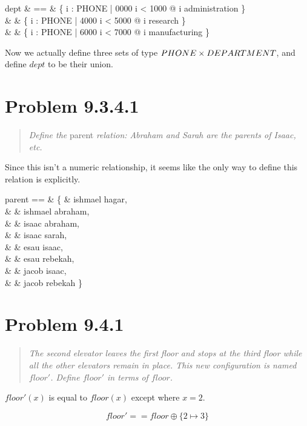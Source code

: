 \documentclass[10pt]{article}
\begin{document}
\begin{syntax}
  dept & == & \{ i : PHONE | 0000 \leq i < 1000 @ i \mapsto administration \} \union \\
       &    & \{ i : PHONE | 4000 \leq i < 5000 @ i \mapsto research \} \union       \\
       &    & \{ i : PHONE | 6000 \leq i < 7000 @ i \mapsto manufacturing \}
\end{syntax}

Now we actually define three sets of type $PHONE \times DEPARTMENT$, and define $dept$ to be their
union.



\section{Problem 9.3.4.1}
\begin{quote}
  {\it Define the} parent {\it relation: Abraham and Sarah are the parents of Isaac, etc.}
\end{quote}

Since this isn't a numeric relationship, it seems like the only way to define this relation is
explicitly.

\begin{syntax}
  parent == & \{ & ishmael \mapsto hagar,   \\
            &    & ishmael \mapsto abraham, \\
            &    & isaac \mapsto abraham,   \\
            &    & isaac \mapsto sarah,     \\
            &    & esau \mapsto isaac,      \\
            &    & esau \mapsto rebekah,    \\
            &    & jacob \mapsto isaac,     \\
            &    & jacob \mapsto rebekah \}
\end{syntax}



\section{Problem 9.4.1}
\begin{quote}
  {\it The second elevator leaves the first floor and stops at the third floor while all the other
    elevators remain in place.  This new configuration is named $floor'$.  Define $floor'$ in terms
    of $floor$.}
\end{quote}

$floor'(x)$ is equal to $floor(x)$ except where $x = 2$.

\[ floor' == floor \oplus \{ 2 \mapsto 3 \} \]
\end{document}
